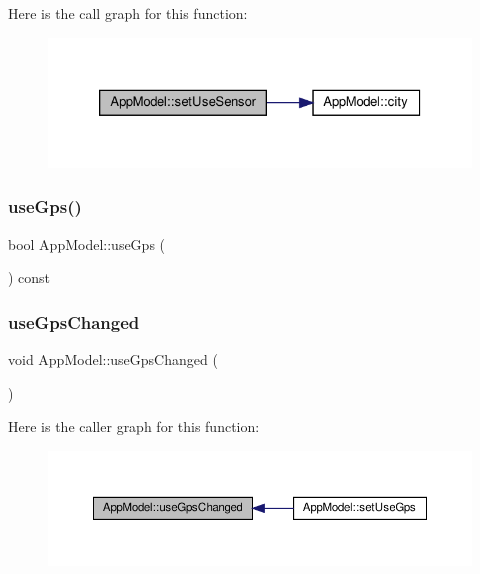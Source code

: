 Here is the call graph for this function\+:
\nopagebreak
\begin{figure}[H]
\begin{center}
\leavevmode
\includegraphics[width=326pt]{class_app_model_ad1369130f74b4aabd0ac0d6b1b030014_cgraph}
\end{center}
\end{figure}
\mbox{\label{class_app_model_a0e6e7506ba084133a6927d8c633ad699}} 
\subsubsection{\texorpdfstring{use\+Gps()}{useGps()}}
{\footnotesize\ttfamily bool App\+Model\+::use\+Gps (\begin{DoxyParamCaption}{ }\end{DoxyParamCaption}) const}

\mbox{\label{class_app_model_af0007ee4da862433868baa5fdb31a3fe}} 
\subsubsection{\texorpdfstring{use\+Gps\+Changed}{useGpsChanged}}
{\footnotesize\ttfamily void App\+Model\+::use\+Gps\+Changed (\begin{DoxyParamCaption}{ }\end{DoxyParamCaption})\hspace{0.3cm}{\ttfamily [signal]}}

Here is the caller graph for this function\+:
\nopagebreak
\begin{figure}[H]
\begin{center}
\leavevmode
\includegraphics[width=350pt]{class_app_model_af0007ee4da862433868baa5fdb31a3fe_icgraph}
\end{center}
\end{figure}
\mbox{\label{class_app_model_a5b83f8c93976273d6e9f1664e62efe63}} 
